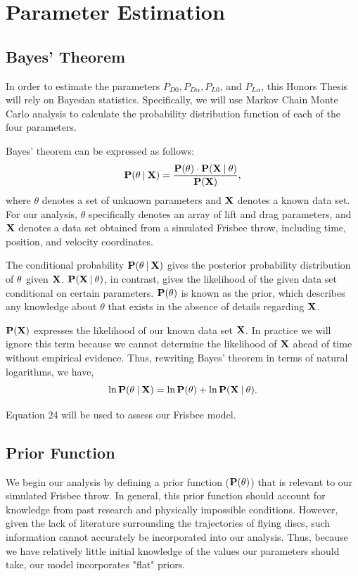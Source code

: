 \documentclass[a4paper,12pt, oneside]{article}
\newcommand\givenbase[1][]{\:#1\lvert\:}
\let\given\givenbase
\begin{document}
\section{Parameter Estimation}
\subsection{Bayes' Theorem}
In order to estimate the parameters $P_{D0}, P_{D\alpha}, P_{L0}$, and $P_{L\alpha}$, this Honors Thesis will rely on Bayesian statistics. Specifically, we will use Markov Chain Monte Carlo analysis to calculate the probability distribution function of each of the four parameters. 

Bayes' theorem can be expressed as follows:
\begin{equation}
\bold{P}(\theta\given\bold{X})=\frac{\bold{P(\theta})\cdot\bold{P({X}\given\theta})}{\bold{P(\bold{X})}},
\end{equation}
where $\theta$ denotes a set of unknown parameters and $\bold{X}$ denotes a known data set. For our analysis, $\theta$ specifically denotes an array of lift and drag parameters, and $\bold{X}$ denotes a data set obtained from a simulated Frisbee throw, including time, position, and velocity coordinates.

The conditional probability $\bold{P(\theta\given\bold{X})}$ gives the posterior probability distribution of $\bold{\theta}$ given $\bold{X}$. $\bold{P({X}\given\theta})$, in contrast, gives the likelihood of the given data set conditional on certain parameters. $\bold{P(\theta)}$ is known as the prior, which describes any knowledge about $\theta$ that exists in the absence of details regarding $\bold{X}$.

$\bold{P(\bold{X})}$ expresses the likelihood of our known data set $\bold{X}$. In practice we will ignore this term because we cannot determine the likelihood of $\bold{X}$ ahead of time without empirical evidence. Thus, rewriting Bayes' theorem in terms of natural logarithms, we have,
\begin{equation}
\ln\bold{P}(\theta\given\bold{X})=\ln{\bold{P(\theta})+\ln\bold{P({X}\given\theta})}.
\end{equation}

Equation 24 will be used to assess our Frisbee model.
\subsection{Prior Function}
We begin our analysis by defining a prior function ($\bold{P(\theta)}$) that is relevant to our simulated Frisbee throw. In general, this prior function should account for knowledge from past research and physically impossible conditions. However, given the lack of literature surrounding the trajectories of flying discs, such information cannot accurately be incorporated into our analysis.  Thus, because we have relatively little initial knowledge of the values our parameters should take, our model incorporates "flat" priors. 
\end{document}

